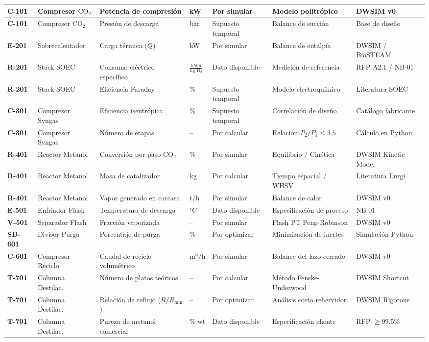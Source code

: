 \documentclass[11pt,letterpaper]{article}
\begin{document}
\begin{small}
\begin{longtable}{|p{1.2cm}|p{2.2cm}|p{3.2cm}|p{1.2cm}|p{2.4cm}|p{2.6cm}|p{2.4cm}|}
    \textbf{C-101} & Compresor $\text{CO}_2$ & Potencia de compresión & kW & Por simular & Modelo politrópico & DWSIM v0 \\ \hline
    \textbf{C-101} & Compresor $\text{CO}_2$ & Presión de descarga & bar & Supuesto temporal & Balance de succión & Base de diseño \\ \hline
    \textbf{E-201} & Sobrecalentador & Carga térmica ($\dot{Q}$) & kW & Por simular & Balance de entalpía & DWSIM / BioSTEAM \\ \hline
    \textbf{R-201} & Stack SOEC & Consumo eléctrico específico & $\frac{\text{kWh}}{\text{kg }\text{H}_2}$ & Dato disponible & Medición de referencia & RFP A2.1 / NB-01 \\ \hline
    \textbf{R-201} & Stack SOEC & Eficiencia Faraday & \% & Supuesto temporal & Modelo electroquímico & Literatura SOEC \\ \hline
    \textbf{C-301} & Compresor Syngas & Eficiencia isentrópica & \% & Supuesto temporal & Correlación de diseño & Catálogo fabricante \\ \hline
    \textbf{C-301} & Compresor Syngas & Número de etapas & -- & Por calcular & Relación $P_2/P_1 \le 3.5$ & Cálculo en Python \\ \hline
    \textbf{R-401} & Reactor Metanol & Conversión por paso $\text{CO}_2$ & \% & Por simular & Equilibrio / Cinética & DWSIM Kinetic Model \\ \hline
    \textbf{R-401} & Reactor Metanol & Masa de catalizador & kg & Por calcular & Tiempo espacial / WHSV & Literatura Lurgi \\ \hline
    \textbf{R-401} & Reactor Metanol & Vapor generado en carcasa & t/h & Por simular & Balance de calor & DWSIM v0 \\ \hline
    \textbf{E-501} & Enfriador Flash & Temperatura de descarga & $^\circ\text{C}$ & Dato disponible & Especificación de proceso & NB-01 \\ \hline
    \textbf{V-501} & Separador Flash & Fracción vaporizada & -- & Por simular & Flash PT Peng-Robinson & DWSIM v0 \\ \hline
    \textbf{SD-601} & Divisor Purga & Porcentaje de purga & \% & Por optimizar & Minimización de inertes & Simulación Python \\ \hline
    \textbf{C-601} & Compresor Reciclo & Caudal de reciclo volumétrico & $\text{m}^3/\text{h}$ & Por simular & Balance del lazo cerrado & DWSIM v0 \\ \hline
    \textbf{T-701} & Columna Destilac. & Número de platos teóricos & -- & Por calcular & Método Fenske-Underwood & DWSIM Shortcut \\ \hline
    \textbf{T-701} & Columna Destilac. & Relación de reflujo ($R/R_{\min}$) & -- & Por optimizar & Análisis costo rehervidor & DWSIM Rigorous \\ \hline
    \textbf{T-701} & Columna Destilac. & Pureza de metanol comercial & \% wt & Dato disponible & Especificación cliente & RFP $\ge 99.5\%$ \\ \hline
\end{longtable}
\end{small}
\end{document}
